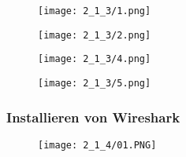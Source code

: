     \begin{figure}
        \centering
        \texttt{[image: 2\_1\_3/1.png]}
    \end{figure}

    \begin{figure}
        \centering
        \texttt{[image: 2\_1\_3/2.png]}
    \end{figure}

    \begin{figure}
        \centering
        \texttt{[image: 2\_1\_3/4.png]}
    \end{figure}

    \begin{figure}
        \centering
        \texttt{[image: 2\_1\_3/5.png]}
    \end{figure}

\subsubsection{Installieren von Wireshark}
    \begin{figure}
        \centering
        \texttt{[image: 2\_1\_4/01.PNG]}
    \end{figure}
